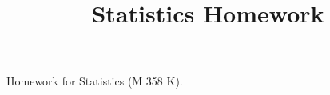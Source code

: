 \documentclass[fontsize=9pt]{article}
\title{Statistics Homework}
\date{}
\begin{document}
\maketitle
Homework for Statistics (M 358 K). 

\tableofcontents
\newpage
    
    
    
\end{document}
